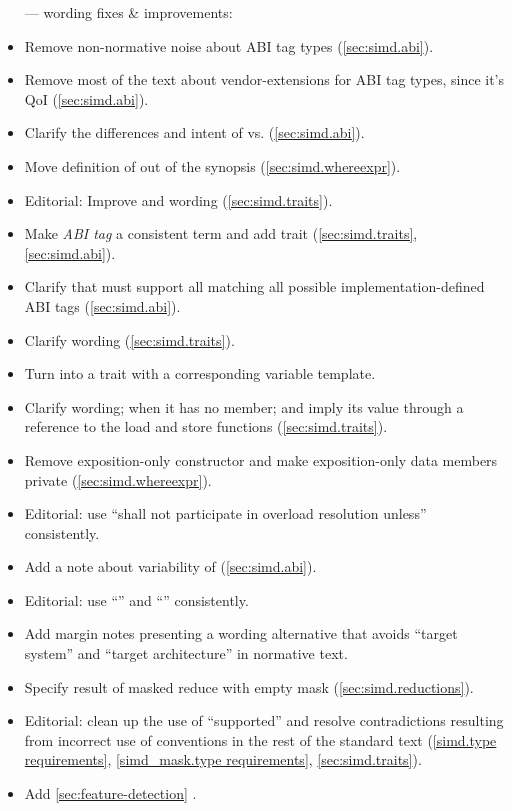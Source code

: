 \begin{itemize}
  \item[---] wording fixes \& improvements:
  \item Remove non-normative noise about ABI tag types (\ref{sec:simd.abi}).
  \item Remove most of the text about vendor-extensions for ABI tag types, since it's QoI (\ref{sec:simd.abi}).
  \item Clarify the differences and intent of  vs.  (\ref{sec:simd.abi}).
  \item Move definition of \whereexpression out of the synopsis (\ref{sec:simd.whereexpr}).
  \item Editorial: Improve  and  wording (\ref{sec:simd.traits}).
  \item Make \emph{ABI tag} a consistent term and add  trait (\ref{sec:simd.traits}, \ref{sec:simd.abi}).
  \item Clarify that \fixedsizeN must support all  matching all possible implementation-defined ABI tags (\ref{sec:simd.abi}).
  \item Clarify  wording (\ref{sec:simd.traits}).
  \item Turn  into a trait with a corresponding  variable template.
  \item Clarify  wording; when it has no  member; and imply its value through a reference to the load and store functions (\ref{sec:simd.traits}).
  \item Remove exposition-only  constructor and make exposition-only data members private (\ref{sec:simd.whereexpr}).
  \item Editorial: use “shall not participate in overload resolution unless” consistently.
  \item Add a note about variability of  (\ref{sec:simd.abi}).
  \item Editorial: use “\targetArch{}” and “\currentTarget{}” consistently.
  \item Add margin notes presenting a wording alternative that avoids “target system” and “target architecture” in normative text.
  \item Specify result of masked reduce with empty mask (\ref{sec:simd.reductions}).
  \item Editorial: clean up the use of “supported” and resolve contradictions resulting from incorrect use of conventions in the rest of the standard text (\ref{simd.type requirements}, \ref{simd_mask.type requirements}, \ref{sec:simd.traits}).
  \item Add \autoref{sec:feature-detection} .
\end{itemize}

